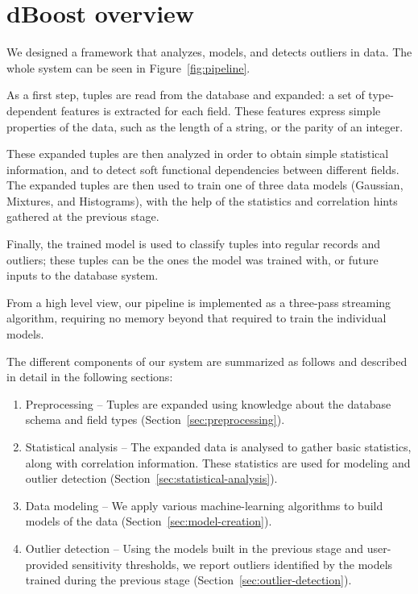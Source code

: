 \section{dBoost overview}
\label{sec:overview}

We designed a framework that analyzes, models, and detects outliers in data.
The whole system can be seen in Figure~\ref{fig:pipeline}.

As a first step, tuples are read from the database and expanded: a set of type-dependent features is extracted for each field. These features express simple properties of the data, such as the length of a string, or the parity of an integer.

These expanded tuples are then analyzed in order to obtain simple statistical information, and to detect soft functional dependencies between different fields. The expanded tuples are then used to train one of three data models (Gaussian, Mixtures, and Histograms), with the help of the statistics and correlation hints gathered at the previous stage.

Finally, the trained model is used to classify tuples into regular records and outliers; these tuples can be the ones the model was trained with, or future inputs to the database system.

From a high level view, our pipeline is implemented as a three-pass streaming algorithm, requiring no memory beyond that required to train the individual models.

The different components of our system are summarized as follows and described in detail in the following sections:

\begin{enumerate}
\item Preprocessing -- Tuples are expanded using knowledge about the database schema and field types (Section~\ref{sec:preprocessing}).
\item Statistical analysis -- The expanded data is analysed to gather basic statistics, along with correlation information. These statistics are used for modeling and outlier detection (Section~\ref{sec:statistical-analysis}).
\item Data modeling -- We apply various machine-learning algorithms to build models of the data (Section~\ref{sec:model-creation}).
\item Outlier detection -- Using the models built in the previous stage and user-provided sensitivity thresholds, we report outliers identified by the models trained during the previous stage (Section~\ref{sec:outlier-detection}).
\end{enumerate}
